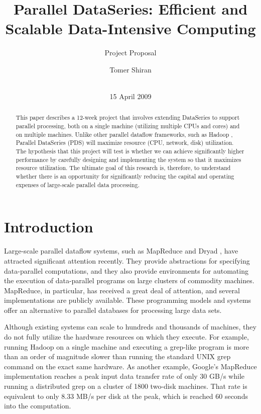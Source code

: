 \documentclass{acm_proc_article-sp}
\begin{document}
\title{Parallel DataSeries: Efficient and Scalable Data-Intensive Computing}
\subtitle{Project Proposal}
\author{
\alignauthor
Tomer Shiran\\
       \\
\and
}
\date{15 April 2009}
\maketitle
\begin{abstract}
This paper describes a 12-week project that involves extending DataSeries to support parallel processing, both on a single machine (utilizing multiple CPUs and cores) and on multiple machines. Unlike other parallel dataflow frameworks, such as Hadoop \cite{hadoop}, Parallel DataSeries (PDS) will maximize resource (CPU, network, disk) utilization. The hypothesis that this project will test is whether we can achieve significantly higher performance by carefully designing and implementing the system so that it maximizes resource utilization. The ultimate goal of this research is, therefore, to understand whether there is an opportunity for significantly reducing the capital and operating expenses of large-scale parallel data processing.
\end{abstract}
\section{Introduction}
Large-scale parallel dataflow systems, such as MapReduce \cite{mapreduce} and Dryad \cite{dryad}, have attracted significant attention recently. They provide abstractions for specifying data-parallel computations, and they also provide environments for automating the execution of data-parallel programs on large clusters of commodity machines. MapReduce, in particular, has received a great deal of attention, and several implementations \cite{hadoop, phoenix} are publicly available. These programming models and systems offer an alternative to parallel databases \cite{paralleldatabases} for processing large data sets.

Although existing systems can scale to hundreds and thousands of machines, they do not fully utilize the hardware resources on which they execute. For example, running Hadoop on a single machine and executing a grep-like program is more than an order of magnitude slower than running the standard UNIX grep command on the exact same hardware. As another example, Google's MapReduce implementation reaches a peak input data transfer rate of only 30 GB/s while running a distributed grep on a cluster of 1800 two-disk machines. That rate is equivalent to only 8.33 MB/s per disk at the peak, which is reached 60 seconds into the computation.
\end{document}
